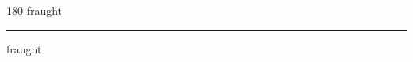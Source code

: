 
\begin{frame}
\begin{center}
\begin{turn}{180}
{\fontsize{2.5cm}{1em}\selectfont fraught}
\end{turn}
\vspace{1em}\par  
\hrule
\vspace{1em}\par  
{\fontsize{2.5cm}{1em}\selectfont fraught}
\end{center}
\end{frame}
